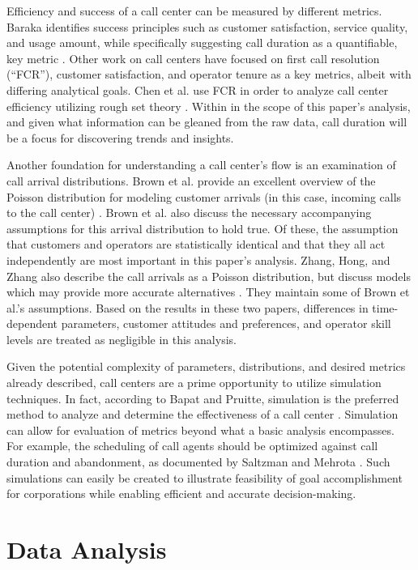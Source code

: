 \documentclass[12pt]{article}
\begin{document}
Efficiency and success of a call center can be measured by different metrics.  Baraka identifies success principles such as customer satisfaction, service quality, and usage amount, while specifically suggesting call duration as a quantifiable, key metric \cite{baraka}. Other work on call centers have focused on first call resolution (“FCR”), customer satisfaction, and operator tenure as a key metrics, albeit with differing analytical goals.  Chen et al. use FCR in order to analyze call center efficiency utilizing rough set theory \cite{chen}. Within in the scope of this paper’s analysis, and given what information can be gleaned from the raw data, call duration will be a focus for discovering trends and insights.
\par
Another foundation for understanding a call center’s flow is an examination of call arrival distributions. Brown et al. provide an excellent overview of the Poisson distribution for modeling customer arrivals (in this case, incoming calls to the call center) \cite{brown}.  Brown et al. also discuss the necessary accompanying assumptions for this arrival distribution to hold true. Of these, the assumption that customers and operators are statistically identical and that they all act independently are most important in this paper’s analysis. Zhang, Hong, and Zhang also describe the call arrivals as a Poisson distribution, but discuss models which may provide more accurate alternatives \cite{zhang}. They maintain some of Brown et al.’s assumptions. Based on the results in these two papers, differences in time-dependent parameters, customer attitudes and preferences, and operator skill levels are treated as negligible in this analysis.
\par
Given the potential complexity of parameters, distributions, and desired metrics already described, call centers are a prime opportunity to utilize simulation techniques.  In fact, according to Bapat and Pruitte, simulation is the preferred method to analyze and determine the effectiveness of a call center \cite{bapat}.  Simulation can allow for evaluation of metrics beyond what a basic analysis encompasses.  For example, the scheduling of call agents should be optimized against call duration and abandonment, as documented by Saltzman and Mehrota \cite{saltzman}.  Such simulations can easily be created to illustrate feasibility of goal accomplishment for corporations while enabling efficient and accurate decision-making\cite{saltzman2}.


\section{Data Analysis}
\end{document}
